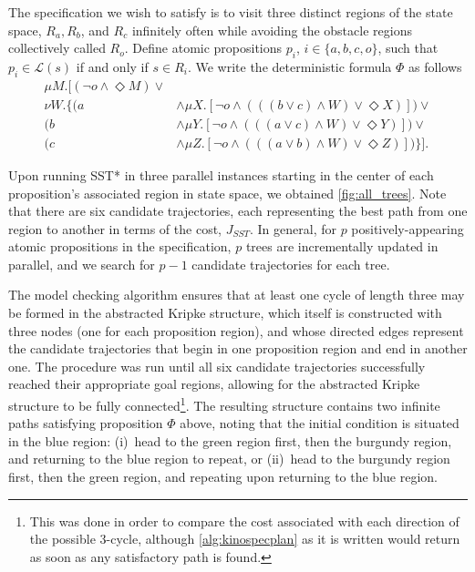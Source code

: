 The specification we wish to satisfy is to visit three distinct regions of the state space,
$R_a, R_b$, and $R_c$ infinitely often while avoiding the obstacle regions collectively called $R_o$. Define atomic propositions $p_i$, $i \in \{a, b, c, o\}$, such that ${p_i} \in \mathcal{L}(s)$ if and only if $s \in R_i$. We write the deterministic \mucalc{} formula $\Phi$ as follows
\begin{align*}
    \mu M.[  (\lnot o \land \Diamond M) \lor \\
        \nu W.\{
            ( a &\land \mu X.[\lnot o \land ( ((b \lor c) \land W) \lor \Diamond X)] ) \lor \\
            ( b &\land \mu Y.[\lnot o \land ( ((a \lor c) \land W) \lor \Diamond Y)] ) \lor \\
            ( c &\land \mu Z.[\lnot o \land ( ((a \lor b) \land W) \lor \Diamond Z)] ) \} ].
\end{align*}

Upon running SST* in three parallel instances starting in the center of each proposition's associated region in state space, we obtained \autoref{fig:all_trees}. Note that there are six candidate trajectories, each representing the best path from one region to another in terms of the cost, $J_{SST}$. In general, for $p$ positively-appearing atomic propositions in the {\mucalc{}} specification, $p$ trees are incrementally updated in parallel, and we search for ${p-1}$ candidate trajectories for each tree.

The model checking algorithm ensures that at least one cycle of length three may be formed in the abstracted Kripke structure, which itself is constructed with three nodes (one for each proposition region), and whose directed edges represent the candidate trajectories that begin in one proposition region and end in another one. The procedure was run until all six candidate trajectories successfully reached their appropriate goal regions, allowing for the abstracted Kripke structure to be fully connected\footnote{This was done in order to compare the cost associated with each direction of the possible 3-cycle, although \autoref{alg:kinospecplan} as it is written would return as soon as any satisfactory path is found.}. The resulting structure contains two infinite paths satisfying proposition $\Phi$ above, noting that the initial condition is situated in the blue region: (i)\ head to the green region first, then the burgundy region, and returning to the blue region to repeat, or (ii)\ head to the burgundy region first, then the green region, and repeating upon returning to the blue region.

